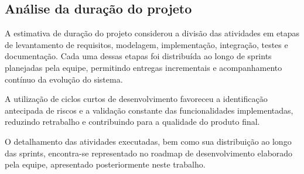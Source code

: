 \subsection{Análise da duração do projeto}

A estimativa de duração do projeto considerou a divisão das atividades em etapas de levantamento de requisitos, modelagem, implementação, integração, testes e documentação. Cada uma dessas etapas foi distribuída ao longo de sprints planejadas pela equipe, permitindo entregas incrementais e acompanhamento contínuo da evolução do sistema.

A utilização de ciclos curtos de desenvolvimento favoreceu a identificação antecipada de riscos e a validação constante das funcionalidades implementadas, reduzindo retrabalho e contribuindo para a qualidade do produto final.

O detalhamento das atividades executadas, bem como sua distribuição ao longo das sprints, encontra-se representado no roadmap de desenvolvimento elaborado pela equipe, apresentado posteriormente neste trabalho.